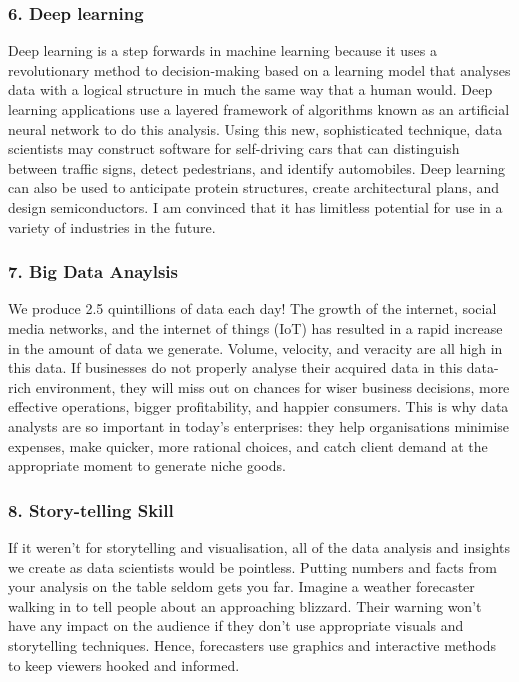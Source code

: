 \documentclass[a4paper, 11pt]{report}
\begin{document}
    \subsubsection{6. Deep learning}
    Deep learning is a step forwards in machine learning because it uses a revolutionary method to decision-making based on a learning model that analyses data with a logical structure in much the same way that a human would.\cite{isaac5} Deep learning applications use a layered framework of algorithms known as an artificial neural network to do this analysis.\cite{isaac5} Using this new, sophisticated technique, data scientists may construct software for self-driving cars that can distinguish between traffic signs, detect pedestrians, and identify automobiles. \cite{isaac1} Deep learning can also be used to anticipate protein structures, create architectural plans, and design semiconductors. I am convinced that it has limitless potential for use in a variety of industries in the future.

    \subsubsection{7. Big Data Anaylsis}
    We produce 2.5 quintillions of data each day!\cite{isaac1} The growth of the internet, social media networks, and the internet of things (IoT) has resulted in a rapid increase in the amount of data we generate. Volume, velocity, and veracity are all high in this data.\cite{isaac6} If businesses do not properly analyse their acquired data in this data-rich environment, they will miss out on chances for wiser business decisions, more effective operations, bigger profitability, and happier consumers.\cite{isaac6} This is why data analysts are so important in today's enterprises: they help organisations minimise expenses, make quicker, more rational choices, and catch client demand at the appropriate moment to generate niche goods.\cite{isaac1}

    \subsubsection{8. Story-telling Skill}
    If it weren't for storytelling and visualisation, all of the data analysis and insights we create as data scientists would be pointless. Putting numbers and facts from your analysis on the table seldom gets you far. Imagine a weather forecaster walking in to tell people about an approaching blizzard. Their warning won't have any impact on the audience if they don't use appropriate visuals and storytelling techniques.\cite{isaac7} Hence, forecasters use graphics and interactive methods to keep viewers hooked and informed. \cite{isaac7}
\end{document}
